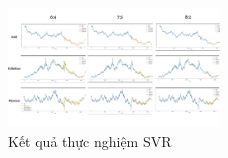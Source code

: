 \begin{figure}[htbp]
\centerline{\includegraphics[width=0.5\textwidth]{img/SVR_result.png}}
\caption{Kết quả thực nghiệm SVR}
\label{fig}
\end{figure}